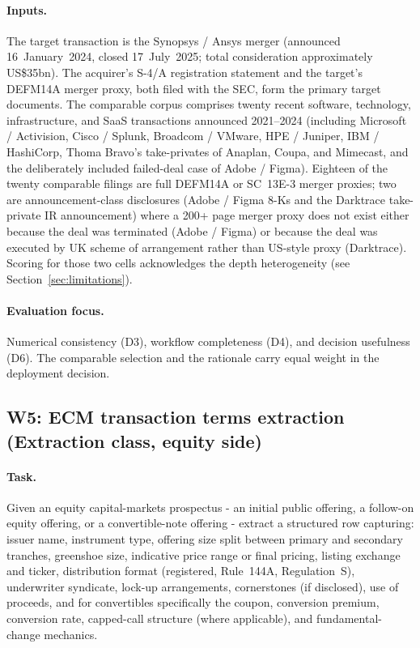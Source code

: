 \documentclass[11pt]{article}
\begin{document}
\paragraph{Inputs.} The target transaction is the Synopsys / Ansys merger (announced 16~January~2024, closed 17~July~2025; total consideration approximately US\$35bn). The acquirer's S-4/A registration statement and the target's DEFM14A merger proxy, both filed with the SEC, form the primary target documents. The comparable corpus comprises twenty recent software, technology, infrastructure, and SaaS transactions announced 2021--2024 (including Microsoft / Activision, Cisco / Splunk, Broadcom / VMware, HPE / Juniper, IBM / HashiCorp, Thoma Bravo's take-privates of Anaplan, Coupa, and Mimecast, and the deliberately included failed-deal case of Adobe / Figma). Eighteen of the twenty comparable filings are full DEFM14A or SC~13E-3 merger proxies; two are announcement-class disclosures (Adobe / Figma 8-Ks and the Darktrace take-private IR announcement) where a 200+ page merger proxy does not exist either because the deal was terminated (Adobe / Figma) or because the deal was executed by UK scheme of arrangement rather than US-style proxy (Darktrace). Scoring for those two cells acknowledges the depth heterogeneity (see Section~\ref{sec:limitations}).

\paragraph{Evaluation focus.} Numerical consistency (D3), workflow completeness (D4), and decision usefulness (D6). The comparable selection and the rationale carry equal weight in the deployment decision.

\subsection{W5: ECM transaction terms extraction (Extraction class, equity side)}

\paragraph{Task.} Given an equity capital-markets prospectus - an initial public offering, a follow-on equity offering, or a convertible-note offering - extract a structured row capturing: issuer name, instrument type, offering size split between primary and secondary tranches, greenshoe size, indicative price range or final pricing, listing exchange and ticker, distribution format (registered, Rule~144A, Regulation~S), underwriter syndicate, lock-up arrangements, cornerstones (if disclosed), use of proceeds, and for convertibles specifically the coupon, conversion premium, conversion rate, capped-call structure (where applicable), and fundamental-change mechanics.
\end{document}

